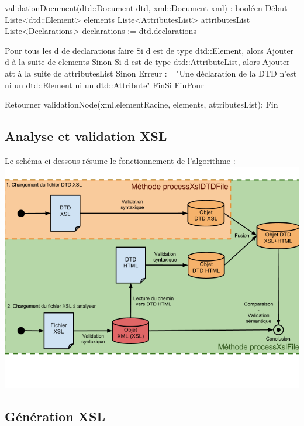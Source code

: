 \documentclass[10pt,a4paper]{article}
\begin{document}
\begin{verbatimtab}
validationDocument(dtd::Document dtd, xml::Document xml) : booléen
Début
	Liste<dtd::Element> elements
	Liste<AttributesList> attributesList   
	Liste<Declarations> declarations := dtd.declarations
	
	Pour tous les d de declarations faire
		Si d est de type dtd::Element, alors
			Ajouter d à la suite de elements
		Sinon
       		Si d est de type dtd::AttributeList, alors
       			Ajouter att à la suite de attributesList
			Sinon
       			Erreur := "Une déclaration de la DTD n'est ni un dtd::Element ni un dtd::Attribute"
		FinSi
	FinPour
   
	Retourner validationNode(xml.elementRacine, elements, attributesList);
Fin
\end{verbatimtab}

\subsection{Analyse et validation XSL}
Le schéma ci-dessous résume le fonctionnement de l'algorithme :
\includegraphics[scale=0.65]{Algorithmes.png} 

\subsection{Génération XSL}
\end{document}
